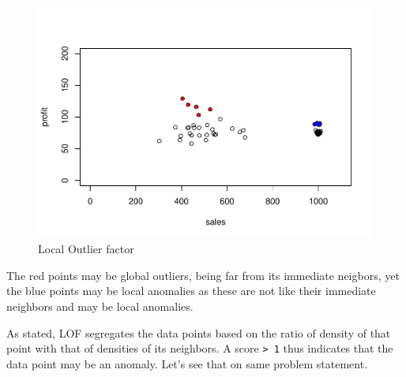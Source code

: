 \documentclass[
]{book}
\begin{document}
\begin{figure}

{\centering \includegraphics[height=0.28\textheight]{DauR_files/figure-latex/an9-1} 

}

\caption{Local Outlier factor}\label{fig:an9}
\end{figure}

The red points may be global outliers, being far from its immediate neigbors, yet the blue points may be local anomalies as these are not like their immediate neighbors and may be local anomalies.

As stated, LOF segregates the data points based on the ratio of density of that point with that of densities of its neighbors. A score \texttt{\textgreater{}\ 1} thus indicates that the data point may be an anomaly. Let's see that on same problem statement.
\end{document}
